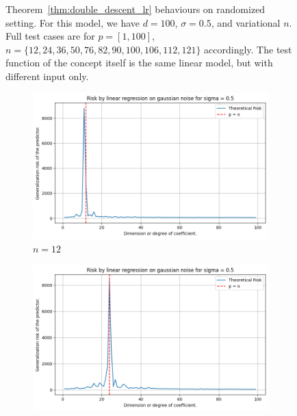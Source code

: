 \documentclass[twoside,10pt]{article}
\begin{document}
\begin{figure}[htb]
  \caption{Theorem~\ref{thm:double_descent_lr} behaviours on randomized setting. For this model, we have $d=100$, $\sigma = 0.5$, and variational $n$. Full test cases are for $p=[1,100]$, $n=\{12,24,36,50,76,82,90,100,106,112,121\}$ accordingly. The test function of the concept itself is the same linear model, but with different input only.}
  \label{fig:11grid}
\end{figure}

\begin{figure}[htb]
  \centering
  \newcommand{\imgwidth}{0.22\textwidth}

  \begin{subfigure}[b]{\imgwidth}
    \includegraphics[width=\linewidth]{img/descent_devel1.png}
    \caption{$n=12$}\label{fig:1a2}
  \end{subfigure}%
  \hfill
  \begin{subfigure}[b]{\imgwidth}
    \includegraphics[width=\linewidth]{img/descent_devel2.png}

\end{subfigure}
\end{figure}
\end{document}
